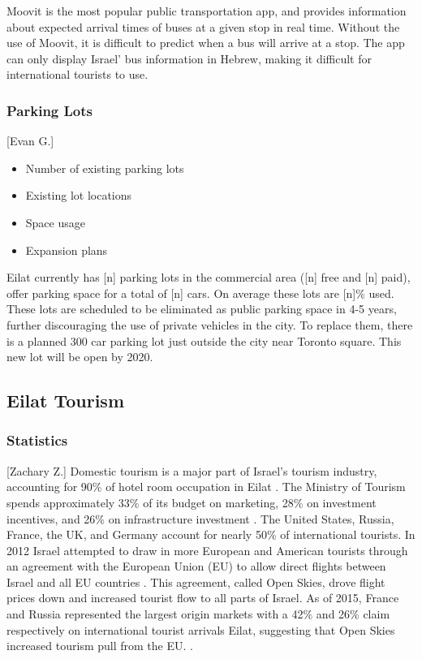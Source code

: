 \documentclass[12pt]{article}                               %
\begin{document}
Moovit is the most popular public transportation app, and provides information about expected arrival times of buses at a given stop in real time. Without the use of Moovit, it is difficult to predict when a bus will arrive at a stop. The app can only display Israel' bus information in Hebrew, making it difficult for international tourists to use.

\subsubsection{Parking Lots}[Evan G.]
\begin{itemize}
    \item Number of existing parking lots
    \item Existing lot locations
    \item Space usage
    \item Expansion plans
\end{itemize}
Eilat currently has [n] parking lots in the commercial area ([n] free and [n] paid), offer parking space for a total of [n] cars. On average these lots are [n]\% used. These lots are scheduled to be eliminated as public parking space in 4-5 years, further discouraging the use of private vehicles in the city. To replace them, there is a planned 300 car parking lot just outside the city near Toronto square. This new lot will be open by 2020.


\subsection{Eilat Tourism}
\subsubsection{Statistics}[Zachary Z.]
Domestic tourism is a major part of Israel's tourism industry, accounting for 90\% of hotel room occupation in Eilat \cite{Benner2017UpgradingEilat}. The Ministry of Tourism spends approximately 33\% of its budget on marketing, 28\% on investment incentives, and 26\% on infrastructure investment \cite{Benner2017UpgradingEilat}. The United States, Russia, France, the UK, and Germany account for nearly 50\% of international tourists. In 2012 Israel attempted to draw in more European and American tourists through an agreement with the European Union (EU) to allow direct flights between Israel and all EU countries \cite{Benner2017UpgradingEilat}. This agreement, called Open Skies, drove flight prices down and increased tourist flow to all parts of Israel. As of 2015, France and Russia represented the largest origin markets with a 42\% and 26\% claim respectively on international tourist arrivals Eilat, suggesting that Open Skies increased tourism pull from the EU. \cite{Benevolo2016SmartBenefits}.
\end{document}
